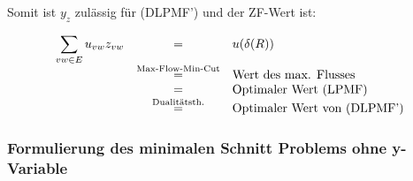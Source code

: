 Somit ist $y_{z}$ zulässig für (DLPMF') und der ZF-Wert ist:

\[\begin{array}{rcl}
\displaystyle \sum_{v w \in E} u_{v w} z_{v w } &=& u(\delta(R))\\
&\stackrel{\mbox{\scriptsize Max-Flow-Min-Cut}}{=}&\mbox{Wert des max.
Flusses}\\
&=& \mbox{Optimaler Wert (LPMF)}\\
&\stackrel{\mbox{\scriptsize Dualitätsth.}}{=}& \mbox{Optimaler Wert von
(DLPMF')} 
\end{array}\] 

\subsubsection{Formulierung des minimalen Schnitt Problems ohne y-Variable}

